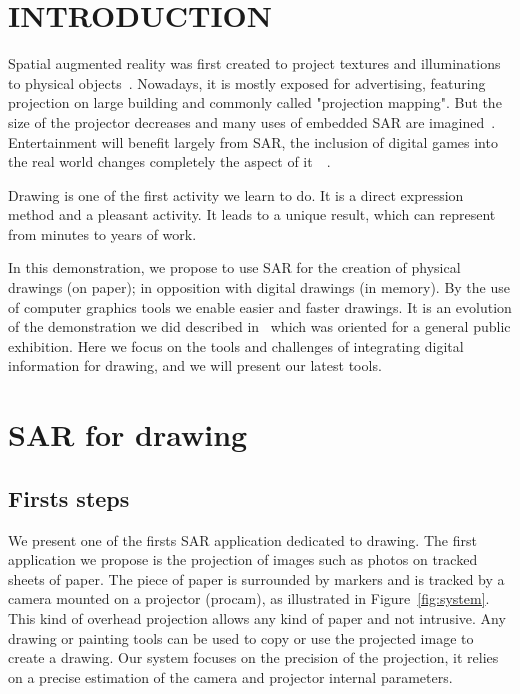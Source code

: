 \documentclass{article}
\begin{document}





\section{INTRODUCTION}

Spatial augmented reality was first created to project textures and illuminations to physical objects~\cite{raskar1999table}. Nowadays, it is mostly exposed for advertising, featuring projection on large building and commonly called "projection mapping". 
But the size of the projector decreases and many uses of embedded SAR are  imagined~\cite{mistry2009sixthsense}. 
Entertainment will benefit largely from SAR, the inclusion of digital games into the real world changes completely the aspect of it~\cite{wilson2007depth}~\cite{jones2010build}.

Drawing is one of the first activity we learn to do. It is a direct expression method and a pleasant activity. It leads to a unique result, which can represent from minutes to years of work. 

In this demonstration, we propose to use SAR for the creation of physical drawings (on paper); in opposition with digital drawings (in memory). By the use of computer graphics tools we enable easier and faster drawings. It is an evolution of the demonstration we did described in~\cite{laviole:2012} which was oriented for a general public exhibition. Here we focus on the tools and challenges of integrating digital information for drawing, and we will present our latest tools.


\section{SAR for drawing}
\subsection{Firsts steps}

We present one of the firsts SAR application dedicated to drawing. The first application we propose is the projection of images such as photos on tracked sheets of paper. The piece of paper is surrounded by markers and is tracked by a camera mounted on a projector (procam), as illustrated in Figure~\ref{fig:system}.
This kind of overhead projection allows any kind of paper and not intrusive. Any drawing or painting tools can be used to copy or use the projected image to create a drawing. Our system focuses on the precision of the projection, it relies on a precise estimation of the camera and projector internal parameters\cite{audet2010direct}. 
\end{document}
